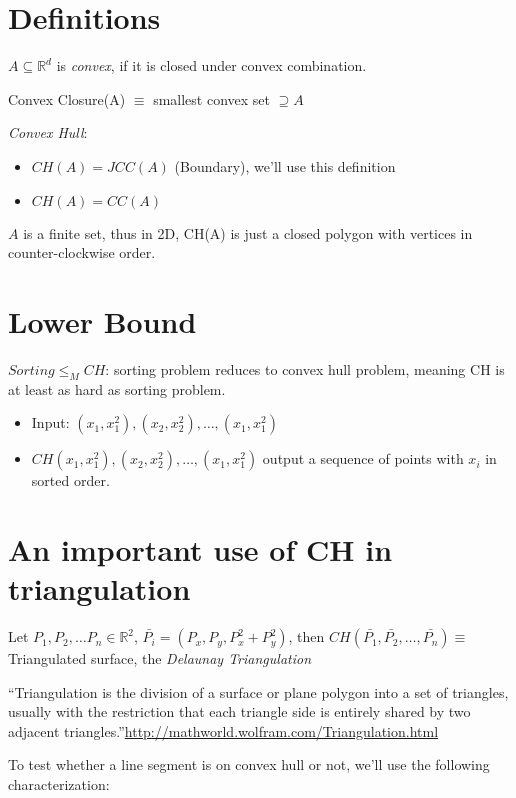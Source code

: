 \documentclass[12pt]{article}
\begin{document}
\section{Definitions}
\begin{definition}
  $A \subseteq \mathbb{R}^d$ is \emph{convex}, if it is closed under
  convex combination.
\end{definition}
\begin{definition}
  Convex Closure(A) $\equiv$ smallest convex set $\supseteq A$
\end{definition}
\begin{definition}
  \emph{Convex Hull}: 
  \begin{itemize}
  \item $CH(A) = JCC(A)$ (Boundary), we'll use this definition 
  \item $CH(A) = CC(A)$
  \end{itemize}
\end{definition}
$A$ is a finite set, thus in 2D, CH(A) is just a closed polygon with
vertices in counter-clockwise order.
\section{Lower Bound}
$Sorting \leq_M CH$: sorting problem reduces to convex hull problem,
meaning CH is at least as hard as sorting problem.
\begin{itemize}
\item Input: $(x_1, x_1^2), (x_2, x_2^2), \dots, (x_1, x_1^2)$
\item $CH(x_1, x_1^2), (x_2, x_2^2), \dots, (x_1, x_1^2)$ output a
  sequence of points with $x_i$ in sorted order.
\end{itemize}
\section{An important use of CH in triangulation}
Let $P_1, P_2, \dots P_n \in \mathbb{R}^2$,
$\bar{P_i} = (P_x, P_y, P_x^2 + P_y^2)$, then
$CH(\bar{P_1}, \bar{P_2}, \dots, \bar{P_n}) \equiv $ Triangulated
  surface, the \emph{Delaunay Triangulation}
 
  ``Triangulation is the division of a surface or plane polygon into a
  set of triangles, usually with the restriction that each triangle
  side is entirely shared by two adjacent
  triangles.''\url{http://mathworld.wolfram.com/Triangulation.html}

  To test whether a line segment is on convex hull or not, we'll use
  the following characterization:
  
\end{document}
